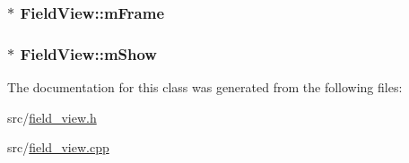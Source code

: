 \hypertarget{a00103_a8a52621f503b9b74b09c26f6e1d78a0a}{
\subsubsection[{m\-Frame}]{$\ast$ Field\-View\-::m\-Frame\hspace{0.3cm}{\ttfamily [private]}}}\label{a00103_a8a52621f503b9b74b09c26f6e1d78a0a}
\hypertarget{a00103_ad4b69c163c69e76a79522a685ecdc2e6}{
\subsubsection[{m\-Show}]{$\ast$ Field\-View\-::m\-Show\hspace{0.3cm}{\ttfamily [private]}}}\label{a00103_ad4b69c163c69e76a79522a685ecdc2e6}


The documentation for this class was generated from the following files\-:\begin{DoxyCompactItemize}
\item 
src/\hyperlink{a00229}{field\-\_\-view.\-h}\item 
src/\hyperlink{a00228}{field\-\_\-view.\-cpp}\end{DoxyCompactItemize}
